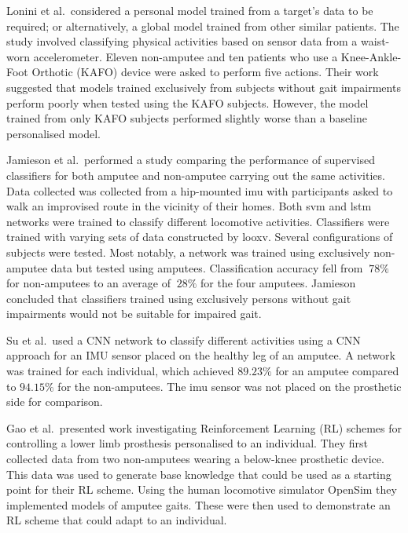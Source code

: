 Lonini et al.~considered a personal model trained from a target's data to be required; or alternatively, a global model trained from other similar patients. The study involved classifying physical activities based on sensor data from a waist-worn accelerometer. Eleven non-amputee and ten patients who use a Knee-Ankle-Foot Orthotic (KAFO) device were asked to perform five actions. Their work suggested that models trained exclusively from subjects without gait impairments perform poorly when tested using the KAFO subjects. However, the model trained from only KAFO subjects performed slightly worse than a baseline personalised model.\cite{Lonini2016}

Jamieson et al.~performed a study comparing the performance of supervised classifiers for both amputee and non-amputee carrying out the same activities. Data collected was collected from a hip-mounted \acrshort{imu} with participants asked to walk an improvised route in the vicinity of their homes. Both \acrfull{svm} and \acrshort{lstm} networks were trained to classify different locomotive activities. Classifiers were trained with varying sets of data constructed by \acrfull{looxv}. Several configurations of subjects were tested. Most notably, a network was trained using exclusively non-amputee data but tested using amputees. Classification accuracy fell from $~78\%$ for non-amputees to an average of $~28\%$ for the four amputees. Jamieson concluded that classifiers trained using exclusively persons without gait impairments would not be suitable for impaired gait.\cite{Jamieson2021}

Su et al.~used a CNN network to classify different activities using a CNN approach for an IMU sensor placed on the healthy leg of an amputee. A network was trained for each individual, which achieved $89.23\%$ for an amputee compared to $94.15\%$ for the non-amputees. The \acrshort{imu} sensor was not placed on the prosthetic side for comparison.\cite{Su2019}

Gao et al.~presented work investigating Reinforcement Learning (RL) schemes for controlling a lower limb prosthesis personalised to an individual. They first collected data from two non-amputees wearing a below-knee prosthetic device. This data was used to generate base knowledge that could be used as a starting point for their RL scheme. Using the human locomotive simulator OpenSim they implemented models of amputee gaits. These were then used to demonstrate an RL scheme that could adapt to an individual.\cite{Gao2020a}

